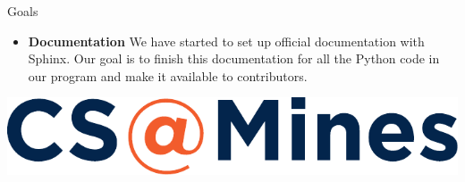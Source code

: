 \documentclass[final]{beamer}
\newlength{\onecolwid}
\begin{document}
\begin{frame}[t]
\begin{columns}[t]
\begin{column}{\onecolwid}
\begin{block}{Goals}
\begin{itemize}
                        \item \textbf{Documentation} We have started to set up
			    official documentation with Sphinx. Our goal is to
			    finish this documentation for all the Python code in
			    our program and make it available to contributors.

                    \end{itemize}

                \end{block}
		\includegraphics[width=.95\linewidth]{csam.pdf}

            \end{column} %

        \end{columns} %

    \end{frame} %
\end{document}
